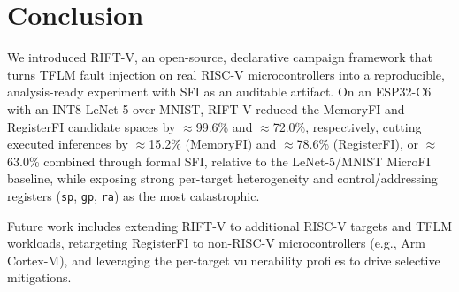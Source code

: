 \documentclass[conference]{IEEEtran}
\begin{document}
\section{Conclusion}
\label{sec:conclusion}

We introduced RIFT-V, an open-source, declarative campaign framework that turns TFLM fault injection on real RISC-V microcontrollers into a reproducible, analysis-ready experiment with SFI as an auditable artifact. On an ESP32-C6 with an INT8 LeNet-5 over MNIST, RIFT-V reduced the MemoryFI and RegisterFI candidate spaces by $\approx$99.6\% and $\approx$72.0\%, respectively, cutting executed inferences by $\approx$15.2\% (MemoryFI) and $\approx$78.6\% (RegisterFI), or $\approx$63.0\% combined through formal SFI, relative to the LeNet-5/MNIST MicroFI~\cite{de2025MicroFI} baseline, while exposing strong per-target heterogeneity and control/addressing registers (\texttt{sp}, \texttt{gp}, \texttt{ra}) as the most catastrophic.

Future work includes extending RIFT-V to additional RISC-V targets and TFLM workloads, retargeting RegisterFI to non-RISC-V microcontrollers (e.g., Arm Cortex-M), and leveraging the per-target vulnerability profiles to drive selective mitigations.





\vspace{12pt}
\end{document}
